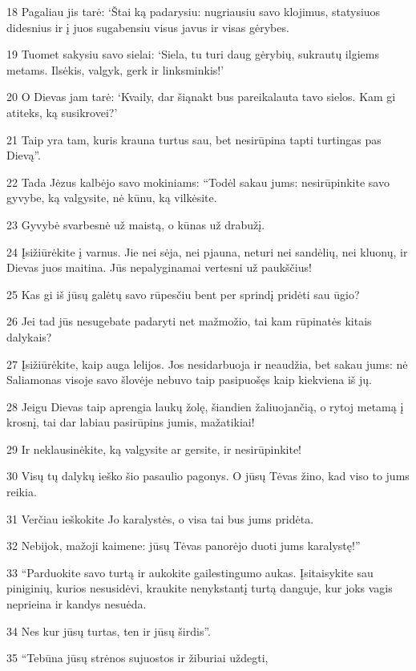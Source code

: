 \par 18 Pagaliau jis tarė: ‘Štai ką padarysiu: nugriausiu savo klojimus, statysiuos didesnius ir į juos sugabensiu visus javus ir visas gėrybes. 
\par 19 Tuomet sakysiu savo sielai: ‘Siela, tu turi daug gėrybių, sukrautų ilgiems metams. Ilsėkis, valgyk, gerk ir linksminkis!’ 
\par 20 O Dievas jam tarė: ‘Kvaily, dar šiąnakt bus pareikalauta tavo sielos. Kam gi atiteks, ką susikrovei?’ 
\par 21 Taip yra tam, kuris krauna turtus sau, bet nesirūpina tapti turtingas pas Dievą”. 
\par 22 Tada Jėzus kalbėjo savo mokiniams: “Todėl sakau jums: nesirūpinkite savo gyvybe, ką valgysite, nė kūnu, ką vilkėsite. 
\par 23 Gyvybė svarbesnė už maistą, o kūnas už drabužį. 
\par 24 Įsižiūrėkite į varnus. Jie nei sėja, nei pjauna, neturi nei sandėlių, nei kluonų, ir Dievas juos maitina. Jūs nepalyginamai vertesni už paukščius! 
\par 25 Kas gi iš jūsų galėtų savo rūpesčiu bent per sprindį pridėti sau ūgio? 
\par 26 Jei tad jūs nesugebate padaryti net mažmožio, tai kam rūpinatės kitais dalykais? 
\par 27 Įsižiūrėkite, kaip auga lelijos. Jos nesidarbuoja ir neaudžia, bet sakau jums: nė Saliamonas visoje savo šlovėje nebuvo taip pasipuošęs kaip kiekviena iš jų. 
\par 28 Jeigu Dievas taip aprengia laukų žolę, šiandien žaliuojančią, o rytoj metamą į krosnį, tai dar labiau pasirūpins jumis, mažatikiai! 
\par 29 Ir neklausinėkite, ką valgysite ar gersite, ir nesirūpinkite! 
\par 30 Visų tų dalykų ieško šio pasaulio pagonys. O jūsų Tėvas žino, kad viso to jums reikia. 
\par 31 Verčiau ieškokite Jo karalystės, o visa tai bus jums pridėta. 
\par 32 Nebijok, mažoji kaimene: jūsų Tėvas panorėjo duoti jums karalystę!” 
\par 33 “Parduokite savo turtą ir aukokite gailestingumo aukas. Įsitaisykite sau piniginių, kurios nesusidėvi, kraukite nenykstantį turtą danguje, kur joks vagis neprieina ir kandys nesuėda. 
\par 34 Nes kur jūsų turtas, ten ir jūsų širdis”. 
\par 35 “Tebūna jūsų strėnos sujuostos ir žiburiai uždegti, 
